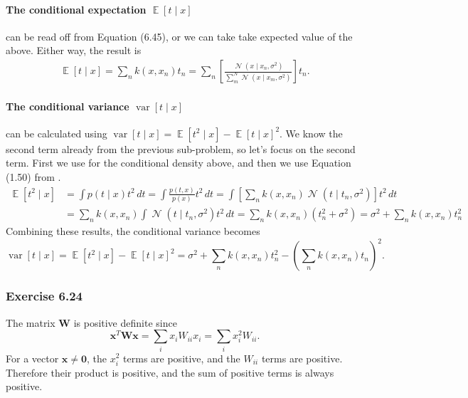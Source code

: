 \documentclass[12pt, a4paper]{article}
\newcommand{\vect}[1]{\bm{#1}}
\DeclareMathOperator{\N}{\mathcal{N}}
\DeclareMathOperator{\E}{\mathbb{E}}
\DeclareMathOperator{\var}{\operatorname{var}}
\begin{document}
\paragraph{The conditional expectation $\E \left[t \mid x\right]$} can be read off from Equation (6.45), or we can take take expected value of the above.
Either way, the result is
\begin{align*}
\E \left[t \mid x\right] 
= 
\sum_n k(x, x_n) t_n 
=  
\sum_n \left[ \frac{\N (x \mid x_n, \sigma^2)}{\sum_m^N \N (x \mid x_m, \sigma^2)} \right] t_n
.
\end{align*}

\paragraph{The conditional variance $\var \left[t \mid x\right]$} can be calculated using $\var \left[t \mid x\right] = \E \left[t^2 \mid x\right] - \E \left[t \mid x\right]^2$.
We know the second term already from the previous sub-problem, so let's focus on the second term.
First we use for the conditional density above, and then we use Equation (1.50) from \cite{bishop_pattern_2011}.
\begin{align*}
\E \left[t^2 \mid x\right] 
&= 
\int p(t \mid x) t^2 \, dt
=  
\int \frac{p(t, x)}{p(x)} t^2 \, dt =
\int \left[ \sum_n k(x, x_n) \N (t \mid t_n, \sigma^2) \right] t^2 \, dt 
\\
&=
\sum_n k(x, x_n) \int  \N (t \mid t_n, \sigma^2)  t^2 \, dt 
=
\sum_n k(x, x_n) (t_n^2 + \sigma^2)
=
\sigma^2 + \sum_n k(x, x_n) t_n^2
\end{align*}
Combining these results, the conditional variance becomes
\begin{equation*}
	\var \left[t \mid x\right] 
	= \E \left[t^2 \mid x\right] - \E \left[t \mid x\right]^2
	=
	\sigma^2 + \sum_n k(x, x_n) t_n^2 - 
	\left( \sum_n k(x, x_n) t_n  \right)^2.
\end{equation*}






\subsubsection*{Exercise 6.24}
The matrix $\vect{W}$ is positive definite since
\begin{equation*}
	\vect{x}^T \vect{W} \vect{x} = \sum_i x_i W_{ii} x_i = \sum_i x_i^2 W_{ii}.
\end{equation*}
For a vector $\vect{x} \neq \vect{0}$, the $x_i^2$ terms are positive, and the $W_{ii}$ terms are positive. 
Therefore their product is positive, and the sum of positive terms is always positive.
\end{document}
